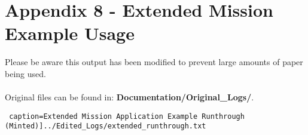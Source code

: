 \documentclass{article}
\begin{document}
\section*{Appendix 8 - Extended Mission Example Usage}

Please be aware this output has been modified to prevent large amounts of paper being used.\\\\
Original files can be found in: \textbf{Documentation/Original\_Logs/}.

\texttt{ caption=Extended Mission Application Example Runthrough (Minted)]{../Edited_Logs/extended_runthrough.txt}}
\end{document}
